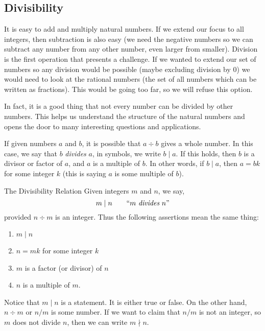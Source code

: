 \documentclass[12pt]{article}
\begin{document}
\subsection{Divisibility}

It is easy to add and multiply natural numbers.  If we extend our focus to all integers, then subtraction is also easy (we need the negative numbers so we can subtract any number from any other number, even larger from smaller).  Division is the first operation that presents a challenge.  If we wanted to extend our set of numbers so any division would be possible (maybe excluding division by 0) we would need to look at the rational numbers (the set of all numbers which can be written as fractions).  This would be going too far, so we will refuse this option.

In fact, it is a good thing that not every number can be divided by other numbers.  This helps us understand the structure of the natural numbers and opens the door to many interesting questions and applications.

If given numbers $a$ and $b$, it is possible that $a \div b$ gives a whole number.  In this case, we say that $b$ {\em divides} $a$, in symbols, we write $b \mid a$.  If this holds, then $b$ is a divisor or factor of $a$, and $a$ is a multiple of $b$.  In other words, if $b \mid a$, then $a = bk$ for some integer $k$ (this is saying $a$ is some multiple of $b$).  

\begin{defbox}{The Divisibility Relation}
	Given integers $m$ and $n$, we say,
	\[m \mid n \qquad \mbox{``$m$ {\em divides} $n$''}\]
	provided $n \div m$ is an integer.  Thus the following assertions mean the same thing:
	\begin{enumerate}
		\item $m \mid n$
		\item $n = mk$ for some integer $k$
		\item $m$ is a factor (or divisor) of $n$
		\item $n$ is a multiple of $m$.
	\end{enumerate}
\end{defbox}  

Notice that $m \mid n$ is a statement. It is either true or false.  On the other hand, $n \div m$ or  $n/m$ is some number.  If we want to claim that $n/m$ is not an integer, so $m$ does not divide $n$, then we can write $m \nmid n$.  
\end{document}
